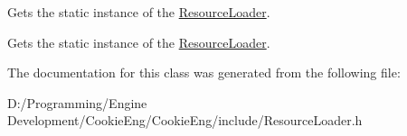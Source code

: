 Gets the static instance of the \hyperlink{class_cookie_eng_1_1_core_1_1_resource_loader}{Resource\+Loader}. 

Gets the static instance of the \hyperlink{class_cookie_eng_1_1_core_1_1_resource_loader}{Resource\+Loader}. 

The documentation for this class was generated from the following file\+:\begin{DoxyCompactItemize}
\item 
D\+:/\+Programming/\+Engine Development/\+Cookie\+Eng/\+Cookie\+Eng/include/Resource\+Loader.\+h\end{DoxyCompactItemize}

